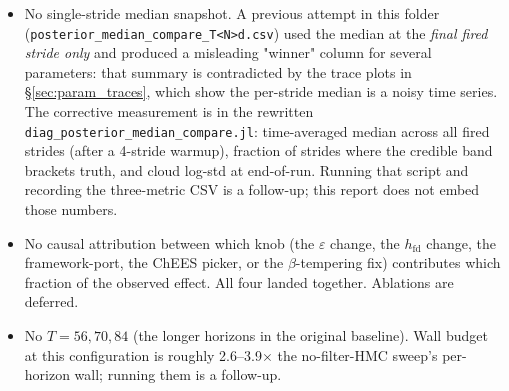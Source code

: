 \documentclass[11pt,a4paper]{article}
\begin{document}
\begin{itemize}[itemsep=2pt]
  \item No single-stride median snapshot. A previous attempt in
        this folder (\texttt{posterior\_median\_compare\_T<N>d.csv})
        used the median at the \emph{final fired stride only} and
        produced a misleading "winner" column for several
        parameters: that summary is contradicted by the trace plots
        in \S\ref{sec:param_traces}, which show the per-stride
        median is a noisy time series. The corrective measurement
        is in the rewritten
        \texttt{diag\_posterior\_median\_compare.jl}: time-averaged
        median across all fired strides (after a 4-stride warmup),
        fraction of strides where the credible band brackets truth,
        and cloud log-std at end-of-run. Running that script and
        recording the three-metric CSV is a follow-up; this report
        does not embed those numbers.
  \item No causal attribution between which knob (the $\varepsilon$
        change, the $h_{\mathrm{fd}}$ change, the framework-port,
        the ChEES picker, or the $\beta$-tempering fix) contributes
        which fraction of the observed effect. All four landed
        together. Ablations are deferred.
  \item No $T = 56, 70, 84$ (the longer horizons in the original
        baseline). Wall budget at this configuration is roughly
        2.6--3.9$\times$ the no-filter-HMC sweep's per-horizon wall;
        running them is a follow-up.
\end{itemize}
\end{document}
